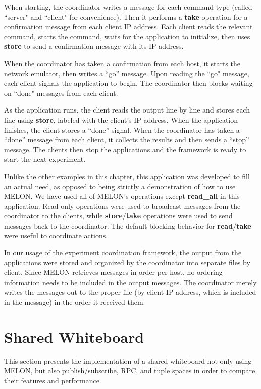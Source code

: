 When starting, the coordinator writes a message for each command type (called ``server" and ``client" for convenience). Then it performs a \textbf{take} operation for a confirmation message from each client IP address. Each client reads the relevant command, starts the command, waits for the application to initialize, then uses \textbf{store} to send a confirmation message with its IP address.

When the coordinator has taken a confirmation from each host, it starts the network emulator, then writes a ``go'' message. Upon reading the ``go" message, each client signals the application to begin. The coordinator then blocks waiting on ``done" messages from each client.

As the application runs, the client reads the output line by line and stores each line using \textbf{store}, labeled with the client's IP address. When the application finishes, the client stores a ``done'' signal. When the coordinator has taken a ``done'' message from each client, it collects the results and then sends a ``stop'' message. The clients then stop the applications and the framework is ready to start the next experiment.

Unlike the other examples in this chapter, this application was developed to fill an actual need, as opposed to being strictly a demonstration of how to use MELON. We have used all of MELON's operations except \textbf{read\_all} in this application. Read-only operations were used to broadcast messages from the coordinator to the clients, while \textbf{store}/\textbf{take} operations were used to send messages back to the coordinator. The default blocking behavior for \textbf{read}/\textbf{take} were useful to coordinate actions.

In our usage of the experiment coordination framework, the output from the applications were stored and organized by the coordinator into separate files by client. Since MELON retrieves messages in order per host, no ordering information needs to be included in the output messages. The coordinator merely writes the messages out to the proper file (by client IP address, which is included in the message) in the order it received them.

\section{Shared Whiteboard}\label{sec:wb}

This section presents the implementation of a shared whiteboard not only using MELON, but also publish/subscribe, RPC, and tuple spaces in order to compare their features and performance.

